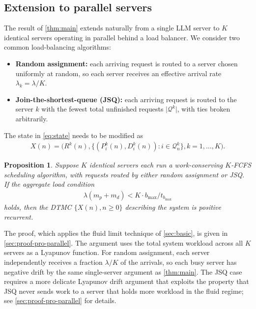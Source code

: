 \documentclass[11pt]{article}
\theoremstyle{plain}
\newtheorem{proposition}[theorem]{Proposition}
\theoremstyle{definition}
\theoremstyle{remark}
\providecommand{\abs}[1]{\lvert#1\rvert}
\begin{document}
  

\subsection{Extension to parallel servers}
\label{sec:parallel-servers}

The result of \cref{thm:main} extends naturally from a single LLM server to $K$ identical servers operating in parallel behind a load balancer. We consider two common load-balancing algorithms:
\begin{itemize}
    \item \textbf{Random assignment:} each arriving request is routed to a server chosen uniformly at random, so each server receives an effective arrival rate $\lambda_k = \lambda/K$.
    \item \textbf{Join-the-shortest-queue (JSQ):} each arriving request is routed to the server $k$ with the fewest total unfinished requests $\abs{\mathcal{Q}^k}$, with ties broken arbitrarily.
\end{itemize}
The state in \cref{eq:state} needs to be modified as
\begin{align}
  \label{eq:stateK}
   X(n) =\Big(R^k(n), \{(P^k_i(n), D^k_i(n)) : i \in \mathcal{Q}^k_n\},k=1, \ldots, K\Big).
\end{align}  

\begin{proposition}\label{pro:parallel}
  Suppose $K$ identical servers each run a work-conserving $K$-FCFS scheduling algorithm, with requests routed by either random assignment or JSQ. If the aggregate load condition
\begin{align}\label{eq:station_load}
    \lambda (m_p+m_d) < K \cdot b_{\max}/t_{b_{\max}}
\end{align}
holds, then the DTMC $\{X(n), n\ge 0\}$ describing the system is positive recurrent.
\end{proposition}
The proof, which applies the fluid limit technique of \cref{sec:basic}, is given in \cref{sec:proof-pro-parallel}. The argument uses the total system workload across all $K$ servers as a Lyapunov function. For random assignment, each server independently receives a fraction $\lambda/K$ of the arrivals, so each busy server has negative drift by the same single-server argument as \cref{thm:main}. The JSQ case requires a more delicate Lyapunov drift argument that exploits the property that JSQ never sends work to a server that holds more workload in the fluid regime; see \cref{sec:proof-pro-parallel} for details.
\end{document}

